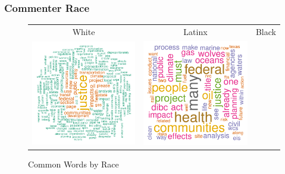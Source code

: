 \documentclass[10pt]{beamer}
\begin{document}
\begin{frame}
\frametitle{Commenter Race}
\begin{figure}
\caption{Common Words by Race}
\begin{tabular}{ccc}
White & Latinx & Black\\
\includegraphics[width = \textwidth/3]{ej_white_words.pdf}
&\includegraphics[width = \textwidth/3]{ej_latinx_words.pdf}

\end{tabular}
\end{figure}
\end{frame}
\end{document}
